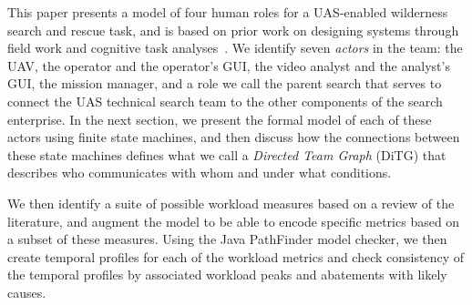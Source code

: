 This paper presents a model of four human roles for a UAS-enabled wilderness search and rescue task, and is based on prior work on designing systems through field work and cognitive task analyses~\cite{Goodrich et al.}.  We identify seven {\em actors} in the team: the UAV, the operator and the operator's GUI, the video analyst and the analyst's GUI, the mission manager, and a role we call the parent search that serves to connect the UAS technical search team to the other components of the search enterprise.  In the next section, we present the formal model of each of these actors using finite state machines, and then discuss how the connections between these state machines defines what we call a {\em Directed Team Graph} (DiTG) that describes who communicates with whom and under what conditions.

We then identify a suite of possible workload measures based on a review of the literature, and augment the model to be able to encode specific metrics based on a subset of these measures.  Using the Java PathFinder model checker, we then create temporal profiles for each of the workload metrics and check consistency of the temporal profiles by associated workload peaks and abatements with likely causes. 

